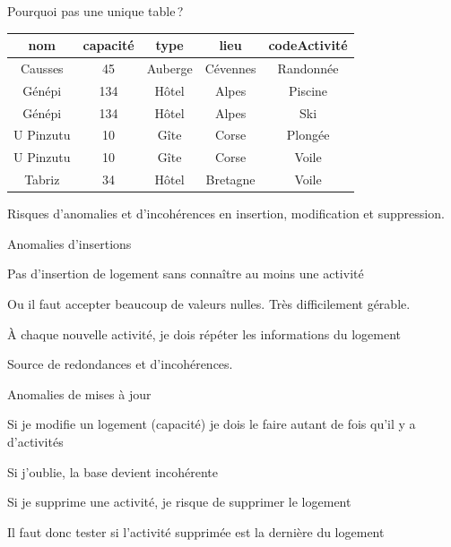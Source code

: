 
\begin{frame}{Pourquoi pas une unique table\,?}

\begin{small}
\begin{tabular}{c|c|c|c|c}
\textbf{nom} & \textbf{capacité} & \textbf{type} & \textbf{lieu} & \textbf{codeActivité}\\ \hline 
Causses & 45 & Auberge & Cévennes & Randonnée\\ \hline 
Génépi & 134 & Hôtel & Alpes & Piscine\\ \hline 
Génépi & 134 & Hôtel & Alpes & Ski\\ \hline 
U Pinzutu & 10 & Gîte & Corse & Plongée\\ \hline 
U Pinzutu & 10 & Gîte & Corse & Voile\\ \hline 
Tabriz & 34 & Hôtel & Bretagne & Voile\\ \hline 
\end{tabular}
\end{small}

\vfill

Risques d'anomalies et d'incohérences en \alert{insertion}, \alert{modification}
et \alert{suppression}. 
\end{frame}


\begin{frame}{Anomalies d'insertions}

\alert{Pas d'insertion de logement sans connaître au moins une activité}
\vfill

Ou il faut accepter beaucoup de valeurs nulles. Très difficilement gérable.

\vfill

\alert{À chaque nouvelle activité, je dois répéter les informations du logement}
\vfill

Source de redondances et d'incohérences.

\end{frame}


\begin{frame}{Anomalies de mises à jour}

\alert{Si je modifie un logement (capacité) je dois le faire autant de fois qu'il y a d'activités}
\vfill

Si j'oublie, la base devient incohérente

\vfill

\alert{Si je supprime une activité, je risque de supprimer le logement}
\vfill

Il faut donc tester si l'activité supprimée est la dernière du logement

\end{frame}


